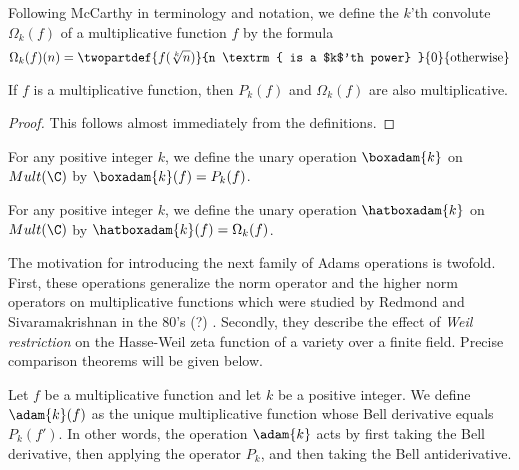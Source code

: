 \documentclass[a4paper]{article}
\begin{document}
\begin{definition}
Following McCarthy \cite{} in terminology and notation, we define the $k$'th convolute $\Omega_k(f) $ of a multiplicative function $f$ by the formula 
$$ \Omega_k(f)(n) = \twopartdef { f(\sqrt[k]{n}) } {n \textrm{ is a $k$'th power} } {0} {\textrm{otherwise}}$$
\end{definition}

\begin{proposition}
If $f$ is a multiplicative function, then $P_k(f)$ and $\Omega_k(f)$ are also multiplicative.
\end{proposition}

\begin{proof}
This follows almost immediately from the definitions.
\end{proof}

\begin{definition}
For any positive integer $k$, we define the unary operation $\boxadam{k}$ on $Mult(\C)$ by $\boxadam{k}(f) = P_k(f)$.
\end{definition}

\begin{definition}
For any positive integer $k$, we define the unary operation $\hatboxadam{k}$ on $Mult(\C)$ by $\hatboxadam{k}(f) = \Omega_k(f)$.
\end{definition}


The motivation for introducing the next family of Adams operations is twofold. First, these operations generalize the norm operator and the higher norm operators on multiplicative functions which were studied by Redmond and Sivaramakrishnan in the 80's (?) \cite{}. Secondly, they describe the effect of \emph{Weil restriction} on the Hasse-Weil zeta function of a variety over a finite field. Precise comparison theorems will be given below.


\begin{definition}
Let $f$ be a multiplicative function and let $k$ be a positive integer. We define $\adam{k}(f)$ as the unique multiplicative function whose Bell derivative equals $P_k(f')$. In other words, the operation $\adam{k}$ acts by first taking the Bell derivative, then applying the operator $P_k$, and then taking the Bell antiderivative.

\end{definition}
\end{document}

